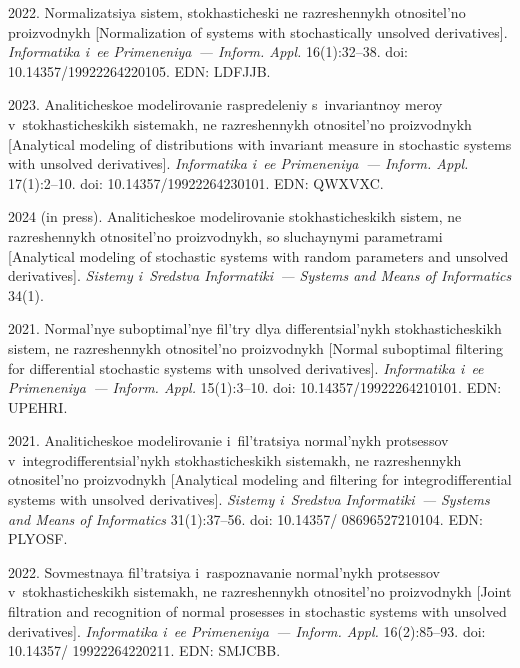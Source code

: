 \begin{multicols}{2}
{{\begin{thebibliography}{99}
 2022.
Normalizatsiya sistem, sto\-kha\-sti\-che\-ski ne razreshennykh otnositel'no proizvodnykh 
[Normalization of systems with stochastically unsolved derivatives]. \textit{Informatika i~ee Primeneniya~--- Inform. Appl.} 16(1):32--38.
doi: 10.14357/19922264220105. EDN: LDFJJB.

 2023. 
Analiticheskoe modelirovanie raspredeleniy s~invariantnoy meroy v~stokhasticheskikh sistemakh, ne razreshennykh otnositel'no proizvodnykh 
[Analytical modeling of distributions with invariant measure in stochastic systems with unsolved derivatives]. 
\textit{Informatika i~ee Primeneniya~--- Inform. Appl.}  17(1):2--10. doi: 10.14357/19922264230101. EDN: QWXVXC.

 2024 (in press). 
Analiticheskoe mo\-de\-li\-ro\-va\-nie stokhasticheskikh  sistem, ne razreshennykh ot\-no\-si\-tel'\-no proizvodnykh, so sluchaynymi parametrami 
[Analytical modeling of stochastic systems with random parameters and unsolved derivatives]. \textit{Sistemy i~Sredstva Informatiki~--- 
Systems and Means of Informatics} 34(1). 

 2021. 
Normal'nye suboptimal'nye fil'try dlya differentsial'nykh stokhasticheskikh sistem, ne raz\-re\-shen\-nykh otnositel'no proizvodnykh 
[Normal suboptimal filtering for differential stochastic systems with unsolved derivatives]. 
\textit{Informatika i~ee Primeneniya~--- Inform. Appl.} 15(1):3--10. doi: 10.14357/19922264210101. EDN: \mbox{UPEHRI}. 

 2021. 
Analiticheskoe modelirovanie i~fil'tratsiya normal'nykh protsessov v~in\-teg\-ro\-dif\-fe\-ren\-ts\-ial'\-nykh sto\-kha\-sti\-che\-skikh sis\-te\-makh, 
ne raz\-re\-shen\-nykh ot\-no\-si\-tel'\-no pro\-iz\-vod\-nykh [Analytical modeling and filtering for integrodifferential systems with unsolved derivatives]. 
\textit{Sistemy i~Sredstva Informatiki~--- Systems and Means of Informatics} 31(1):37--56. doi: 10.14357/ 08696527210104. EDN: PLYOSF.

 2022.
Sovmestnaya fil'tratsiya i~ras\-po\-zna\-va\-nie normal'nykh protsessov v~stokhasticheskikh sis\-te\-makh, ne razreshennykh otnositel'no proizvodnykh 
[Joint filtration and recognition of normal prosesses in stochastic systems with unsolved derivatives]. 
\textit{Informatika i~ee Primeneniya~--- Inform. Appl.} 16(2):85--93. doi: 10.14357/ 19922264220211. EDN: SMJCBB.


\end{thebibliography}}}
\end{multicols}
